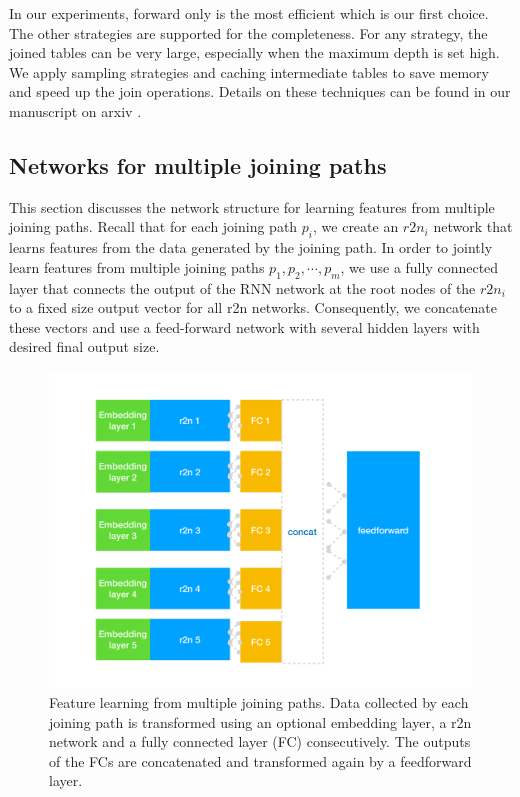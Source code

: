In our experiments, forward only is the most efficient which is our first choice. The other strategies are supported for the completeness. For any strategy, the joined tables can be very large, especially when the maximum depth is set high. We apply sampling strategies and caching intermediate tables to save memory and speed up the join operations. Details on these techniques can be found in our manuscript on arxiv \cite{onebm}.

\subsection{Networks for multiple joining paths}
This section discusses the network structure for learning features from multiple joining paths. Recall that for each joining path $p_i$, we create an $r2n_i$ network that learns features from the data generated by the joining path. In order to jointly learn features from multiple joining paths ${p_1,p_2,\cdots,p_m}$, we use a fully connected layer that connects the output of the RNN network at the root nodes of the $r2n_i$ to a fixed size output vector for all r2n networks. Consequently, we concatenate these vectors and use a feed-forward network with several hidden layers with desired final output size. 
\begin{figure}[tb]
    \centering
    \includegraphics[width=1.0\columnwidth]{./bigr2n.pdf}
    \caption{Feature learning from multiple joining paths. Data collected by each joining path is transformed using an optional embedding layer, a r2n network and a fully connected layer (FC) consecutively. The outputs of the FCs are concatenated and transformed again by a feedforward layer.}
    \label{fig:bigr2n}
\end{figure}  
 
